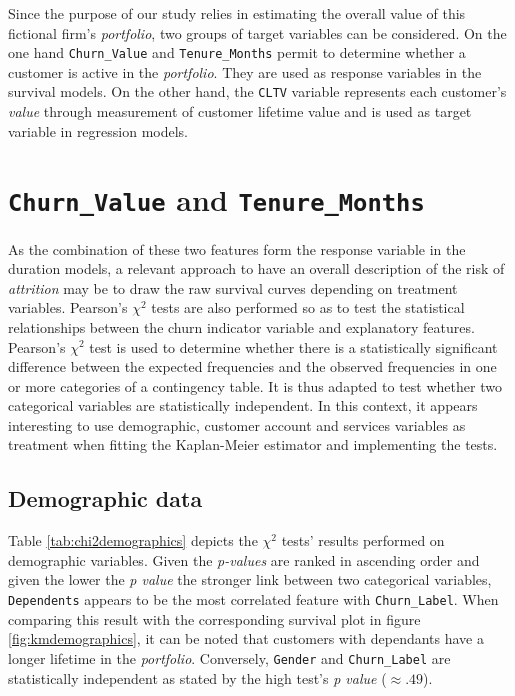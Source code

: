 \documentclass[
]{book}
\begin{document}
Since the purpose of our study relies in estimating the overall value of this fictional firm's \emph{portfolio}, two groups of target variables can be considered. On the one hand \texttt{Churn\_Value} and \texttt{Tenure\_Months} permit to determine whether a customer is active in the \emph{portfolio}. They are used as response variables in the survival models. On the other hand, the \texttt{CLTV} variable represents each customer's \emph{value} through measurement of customer lifetime value and is used as target variable in regression models.

\hypertarget{churn_value-and-tenure_months}{%
\section{\texorpdfstring{\texttt{Churn\_Value} and \texttt{Tenure\_Months}}{Churn\_Value and Tenure\_Months}}\label{churn_value-and-tenure_months}}

As the combination of these two features form the response variable in the duration models, a relevant approach to have an overall description of the risk of \emph{attrition} may be to draw the raw survival curves depending on treatment variables. Pearson's \(\chi^2\) tests are also performed so as to test the statistical relationships between the churn indicator variable and explanatory features. Pearson's \(\chi^2\) test is used to determine whether there is a statistically significant difference between the expected frequencies and the observed frequencies in one or more categories of a contingency table. It is thus adapted to test whether two categorical variables are statistically independent. In this context, it appears interesting to use demographic, customer account and services variables as treatment when fitting the Kaplan-Meier estimator and implementing the tests.

\hypertarget{demographic-data}{%
\subsection*{Demographic data}\label{demographic-data}}

Table \ref{tab:chi2demographics} depicts the \(\chi^2\) tests' results performed on demographic variables. Given the \emph{p-values} are ranked in ascending order and given the lower the \emph{p value} the stronger link between two categorical variables, \texttt{Dependents} appears to be the most correlated feature with \texttt{Churn\_Label}. When comparing this result with the corresponding survival plot in figure \ref{fig:kmdemographics}, it can be noted that customers with dependants have a longer lifetime in the \emph{portfolio}. Conversely, \texttt{Gender} and \texttt{Churn\_Label} are statistically independent as stated by the high test's \emph{p value} (\(\approx .49\)).
\end{document}
